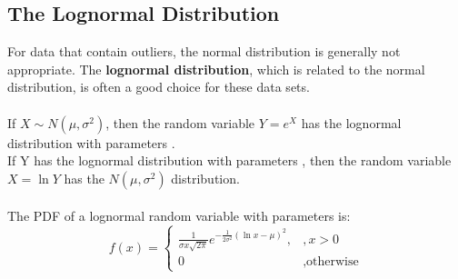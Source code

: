 \documentclass[../main.tex]{subfiles}
\begin{document}
\subsection{The Lognormal Distribution}
For data that contain outliers, the normal distribution is generally not appropriate. The \textbf{lognormal distribution}, which is related to the normal distribution, is often a good choice for these data sets.\\
\\
If $X\sim N(\mu, \sigma^2)$, then the random variable $Y=e^X$ has the lognormal distribution with parameters \munsigma.\\
If Y has the lognormal distribution with parameters \munsigma, then the random variable $X=\ln Y$ has the $N(\mu, \sigma^2)$ distribution.\\
\\
The PDF of a lognormal random variable with parameters \munsigma is:
\begin{equation*}
    f(x)=
    \begin{cases}
    \frac{1}{\sigma x \sqrt{2\pi}}e^{-\frac{1}{2\sigma^2}(\ln x-\mu)^2},& , x > 0 \\
    0 &, \mbox{otherwise}
    \end{cases}
\end{equation*}
\end{document}
